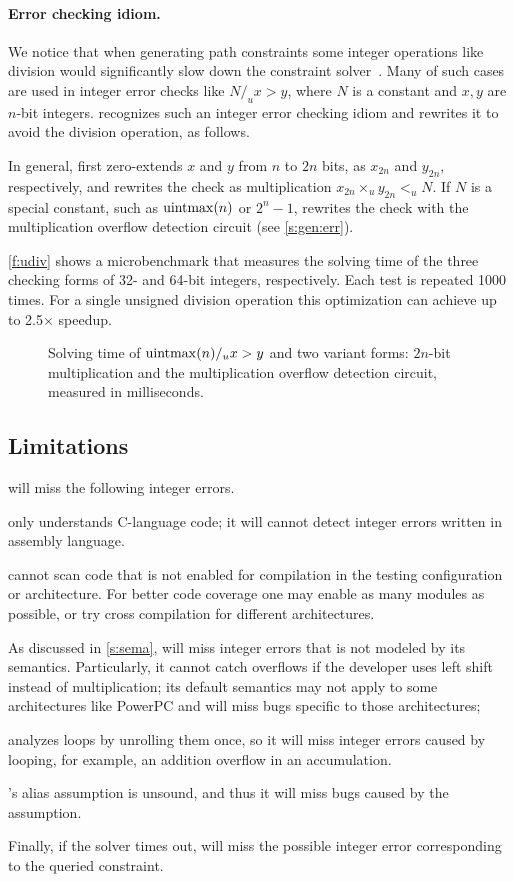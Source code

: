 \paragraph{Error checking idiom.}

We notice that when generating path constraints some integer
operations like division would significantly slow down the constraint
solver~\cite{brummayer:perf}.  Many of such cases are used in integer
error checks like $N /_u x > y$, where $N$ is a constant and $x,
y$ are $n$-bit integers.  \sys recognizes such an integer error
checking idiom and rewrites it to avoid the division operation, as
follows.

In general, \sys first zero-extends $x$ and $y$ from $n$ to $2n$
bits, as $x_{2n}$ and $y_{2n}$, respectively, and rewrites the check
as multiplication $x_{2n} \times_u y_{2n} <_u N$.  If $N$ is a
special constant, such as $\operatorname{uintmax}(n)$ or $2^n-1$, \sys rewrites
the check with the multiplication overflow detection circuit (see
\autoref{s:gen:err}).

\autoref{f:udiv} shows a microbenchmark that measures the solving
time of the three checking forms of 32- and 64-bit integers,
respectively.  Each test is repeated 1000 times.  For a single
unsigned division operation this optimization can achieve up to
2.5$\times$ speedup.

\begin{figure}
\centering

\caption{Solving time of $\operatorname{uintmax}(n) /_u x > y$ and two variant
forms: $2n$-bit multiplication and the multiplication overflow
detection circuit, measured in milliseconds.}
\label{f:udiv}
\end{figure}

\subsection{Limitations}

\sys will miss the following integer errors.

\sys only understands C-language code; it will cannot detect integer
errors written in assembly language.

\sys cannot scan code that is not enabled for compilation in the
testing configuration or architecture.  For better code coverage
one may enable as many modules as possible, or try cross compilation
for different architectures.

As discussed in \autoref{s:sema}, \sys will miss integer errors
that is not modeled by its semantics.  Particularly, it cannot catch
overflows if the developer uses left shift instead of multiplication;
its default semantics may not apply to some architectures like
PowerPC and will miss bugs specific to those architectures;

\sys analyzes loops by unrolling them once, so it will miss integer
errors caused by looping, for example, an addition overflow in an
accumulation.

\sys's alias assumption is unsound, and thus it will miss bugs
caused by the assumption.

Finally, if the solver times out, \sys will miss the possible integer
error corresponding to the queried constraint.
